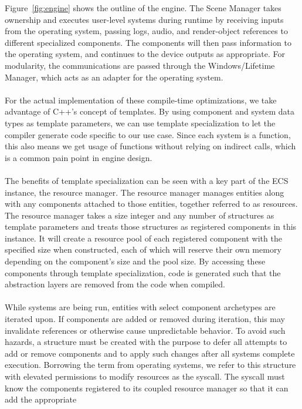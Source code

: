 \noindent Figure~\ref{fig:engine} shows the outline of the engine.
The Scene Manager takes ownership and executes user-level systems during runtime by receiving inputs from the operating system,
passing logs, audio, and render-object references to different specialized components.
The components will then pass information to the operating system, and continues to the device outputs as appropriate.
For modularity, the communications are passed through the Windows/Lifetime Manager, which acts as an adapter for the operating system.
\\\\
For the actual implementation of these compile-time optimizations, we take advantage of C++'s concept of templates.
By using component and system data types as template parameters, we can use template specialization to let
the compiler generate code specific to our use case.
Since each system is a function, this also means we get usage of functions without relying on indirect calls,
which is a common pain point in engine design.
\\\\
The benefits of template specialization can be seen with a key part of the ECS instance, the resource manager.
The resource manager manages entities along with any components attached to those entities, together referred to as resources.
The resource manager takes a size integer and any number of structures as template parameters and treats those
structures as registered components in this instance.
It will create a resource pool of each registered component with the specified size when constructed, each of
which will reserve their own memory depending on the component's size and the pool size.
By accessing these components through template specialization, code is generated such that the abstraction layers
are removed from the code when compiled.
\\\\
While systems are being run, entities with select component archetypes are iterated upon.
If components are added or removed during iteration, this may invalidate references or otherwise cause unpredictable behavior.
To avoid such hazards, a structure must be created with the purpose to defer all attempts to add or remove components
and to apply such changes after all systems complete execution.
Borrowing the term from operating systems, we refer to this structure with elevated permissions to modify resources
as the syscall.
The syscall must know the components registered to its coupled resource manager so that it can add the appropriate
